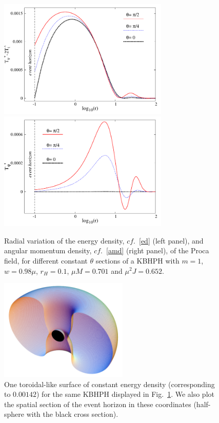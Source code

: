 \begin{figure}[h!]
  \begin{center}
    \includegraphics[width=8.1cm]{papers/Proca/BH-ro-m1.pdf}
      \includegraphics[width=8.1cm]{papers/Proca/BH-T34.pdf}
  \end{center}
  \caption{Radial variation of the energy density, $cf.$~\eqref{ed} (left panel), and angular momentum density, $cf.$~\eqref{amd}  (right panel),  of the Proca field, for different constant $\theta$ sections of a KBHPH with $m=1$, $w=0.98\mu$, $r_H=0.1$,  $\mu M=0.701$ and $\mu^2J=0.652$.}
  \label{figenergybhs}
\end{figure}



\begin{figure}[h!]
  \begin{center}
    \includegraphics[width=6.1cm]{papers/Proca/3Dbh.pdf}
  \end{center}
  \caption{One toroidal-like surface of constant energy density (corresponding to $0.00142$) for the same KBHPH displayed in Fig.~\ref{figenergybhs}. We also plot the spatial section of the event horizon in these coordinates (half-sphere with the black cross section).}
  \label{fig3Dbh}
\end{figure}


